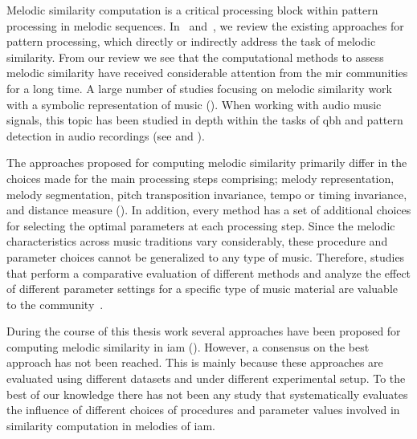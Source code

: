 Melodic similarity computation is a critical processing block within pattern processing in melodic sequences. In~ and~, we review the existing approaches for pattern processing, which directly or indirectly address the task of melodic similarity. From our review we see that the computational methods to assess melodic similarity have received considerable attention from the \gls{mir} communities for a long time. A large number of studies focusing on melodic similarity work with a symbolic representation of music (). When working with audio music signals, this topic has been studied in depth within the tasks of \acrfull{qbh} and pattern detection in audio recordings (see  and ).

The approaches proposed for computing melodic similarity primarily differ in the choices made for the main processing steps comprising; melody representation, melody segmentation, pitch transposition invariance, tempo or timing invariance, and distance measure (). In addition, every method has a  set of additional choices for selecting the optimal parameters at each processing step. Since the melodic characteristics across music traditions vary considerably, these procedure and parameter choices cannot be generalized to any type of music. Therefore, studies that perform a comparative evaluation of different methods and analyze the effect of different parameter settings for a specific type of music material are valuable to the community~\citep{RBDannenberg2007QBH,Rao2014,XavierSerra2011}.

During the course of this thesis work several approaches have been proposed for computing melodic similarity in \gls{iam} (). However, a consensus on the best approach has not been reached. This is mainly because these approaches are evaluated using different datasets and under different experimental setup. To the best of our knowledge there has not been any study that systematically evaluates the influence of different choices of procedures and parameter values involved in similarity computation in melodies of \gls{iam}.





